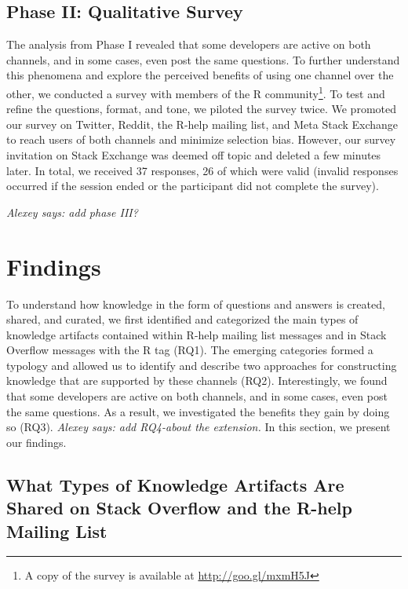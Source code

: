 \documentclass[smallextended]{svjour3}       %
\newcommand{\alexey}[1]{{\color{cyan}\emph{Alexey says: #1}}\xspace}
\newcommand{\alexey}[1]{}
\newcommand{\SO}{Stack Overflow\xspace}
\newcommand{\RH}{R-help\xspace}
\begin{document}
\subsection{Phase II: Qualitative Survey}

The analysis from Phase I revealed that some developers are active on both channels, and in some cases, even post the same questions. To further understand this phenomena and explore the perceived benefits of using one channel over the other, we conducted a survey with members of the R community\footnote{A copy of the survey is available at \url{http://goo.gl/mxmH5J}}. 
To test and refine the questions, format, and tone, we piloted the survey twice. 
We promoted our survey on Twitter, Reddit, the \RH mailing list, and Meta Stack Exchange to reach users of both channels and minimize selection bias. However, our survey invitation on Stack Exchange was deemed off topic and deleted a few minutes later. In total, we received 37 responses, 26 of which were valid (invalid responses occurred if the session ended or the participant did not complete the survey).

\alexey{add phase III?}

 \section{Findings}
\label{cha:findings}
To understand how knowledge in the form of questions and answers is created, shared, and curated, we first identified and categorized the main types of knowledge artifacts contained within \RH mailing list messages and in \SO messages with the R tag (RQ1). The emerging categories formed a typology and allowed us to identify and describe two approaches for constructing knowledge that are supported by these channels (RQ2). Interestingly, we found that some developers are active on both channels, and in some cases, even post the same questions. As a result, we investigated the benefits they gain by doing so (RQ3). \alexey{add RQ4-about the extension.} In this section, we present our findings.

\subsection{What Types of Knowledge Artifacts Are Shared on \SO and the \RH Mailing List}
\label{cha:findings-types}
\end{document}

